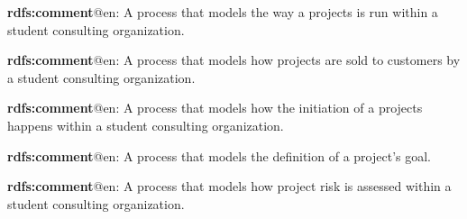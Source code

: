 \documentclass[a4paper, DIV=13, BCOR=0cm]{scrbook}
\begin{document}
\begin{mdframed}[style=onto-1, frametitle={Project Process}]
	{%
		\begin{compactitem}
			\item \textbf{rdfs:comment}@en: A process that models the way a projects is run within a student consulting organization.
		\end{compactitem}
	} %
\end{mdframed}

\begin{mdframed}[style=onto-2, frametitle={Project Sales Process}]
	{%
		\begin{compactitem}
			\item \textbf{rdfs:comment}@en: A process that models how projects are sold to customers by a student consulting organization.
		\end{compactitem}
	} %
\end{mdframed}

\begin{mdframed}[style=onto-2, frametitle={Project Initiation Process}]
	{%
		\begin{compactitem}
			\item \textbf{rdfs:comment}@en: A process that models how the initiation of a projects happens within a student consulting organization.
		\end{compactitem}
	} %
\end{mdframed}

\begin{mdframed}[style=onto-3, frametitle={Project Goal Development Process}]
	{%
		\begin{compactitem}
			\item \textbf{rdfs:comment}@en: A process that models the definition of a project's goal.
		\end{compactitem}
	} %
\end{mdframed}

\begin{mdframed}[style=onto-3, frametitle={Project Risk Assessment Process}]
	{%
		\begin{compactitem}
			\item \textbf{rdfs:comment}@en: A process that models how project risk is assessed within a student consulting organization.
		\end{compactitem}
	} %
\end{mdframed}
\end{document}

